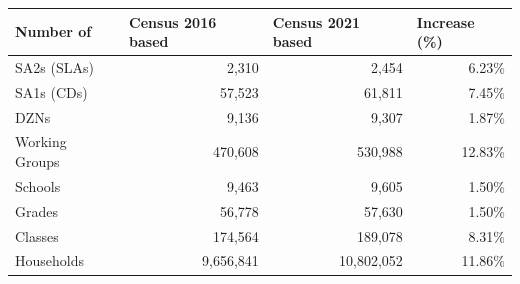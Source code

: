 \documentclass{article}
\begin{document}
\begin{appendices}
\begin{table}[ht]
\centering
\def \arraystretch{1.2}
\begin{tabular}{|l|r|r|r|}
\hline
\rowcolor[HTML]{C0C0C0} 
\textbf{Number of} & \multicolumn{1}{l|}{\cellcolor[HTML]{C0C0C0}\textbf{Census 2016 based}} & \multicolumn{1}{l|}{\cellcolor[HTML]{C0C0C0}\textbf{Census 2021 based}} & \multicolumn{1}{l|}{\cellcolor[HTML]{C0C0C0}\textbf{Increase (\%)}} \\ \hline
SA2s (SLAs)        & 2,310                                                              & 2,454                                                              & 6.23\%                                                                    \\ 
SA1s (CDs)         & 57,523                                                             & 61,811                                                             & 7.45\%                                                                    \\ 
DZNs               & 9,136                                                              & 9,307                                                              & 1.87\%                                                                    \\ 
Working Groups     & 470,608                                                            & 530,988                                                            & 12.83\%                                                                   \\ 
Schools            & 9,463                                                              & 9,605                                                              & 1.50\%                                                                    \\ 
Grades             & 56,778                                                             & 57,630                                                             & 1.50\%                                                                    \\ 
Classes            & 174,564                                                            & 189,078                                                            & 8.31\%                                                                    \\ 
Households         & 9,656,841                                                           & 10,802,052                                                          & 11.86\%                                                                   \\ 

\end{tabular}
\end{table}
\end{appendices}
\end{document}
